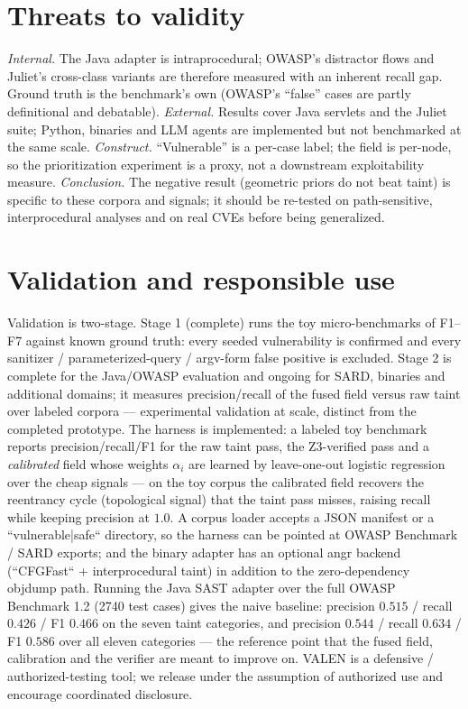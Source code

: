\documentclass[11pt]{article}
\begin{document}
\section{Threats to validity}
\emph{Internal.} The Java adapter is intraprocedural; OWASP's distractor flows and
Juliet's cross-class variants are therefore measured with an inherent recall gap.
Ground truth is the benchmark's own (OWASP's ``false'' cases are partly
definitional and debatable). \emph{External.} Results cover Java servlets and the
Juliet suite; Python, binaries and LLM agents are implemented but not benchmarked
at the same scale. \emph{Construct.} ``Vulnerable'' is a per-case label; the field
is per-node, so the prioritization experiment is a proxy, not a downstream
exploitability measure. \emph{Conclusion.} The negative result (geometric priors
do not beat taint) is specific to these corpora and signals; it should be
re-tested on path-sensitive, interprocedural analyses and on real CVEs before
being generalized.

\section{Validation and responsible use}
Validation is two-stage. Stage 1 (complete) runs the toy micro-benchmarks of
F1--F7 against known ground truth: every seeded vulnerability is confirmed and
every sanitizer / parameterized-query / argv-form false positive is excluded.
Stage 2 is complete for the Java/OWASP evaluation and ongoing for SARD, binaries
and additional domains; it measures precision/recall of the fused field versus raw
taint over labeled corpora --- experimental validation at scale, distinct from the
completed prototype. The harness is implemented: a
labeled toy benchmark reports precision/recall/F1 for the raw taint pass, the
Z3-verified pass and a \emph{calibrated} field whose weights $\alpha_i$ are
learned by leave-one-out logistic regression over the cheap signals --- on the
toy corpus the calibrated field recovers the reentrancy cycle (topological
signal) that the taint pass misses, raising recall while keeping precision at
$1.0$. A corpus loader accepts a JSON manifest or a ``vulnerable|safe``
directory, so the harness can be pointed at OWASP Benchmark / SARD exports; and
the binary adapter has an optional angr backend (``CFGFast`` + interprocedural
taint) in addition to the zero-dependency objdump path. Running the Java SAST
adapter over the full OWASP Benchmark 1.2 (2740 test cases) gives the naive
baseline: precision $0.515$ / recall $0.426$ / F1 $0.466$ on the seven taint
categories, and precision $0.544$ / recall $0.634$ / F1 $0.586$ over all eleven
categories --- the reference point that the fused field, calibration and the
verifier are meant to improve on. VALEN is a defensive /
authorized-testing tool; we release under the assumption of authorized use and
encourage coordinated disclosure.
\end{document}
